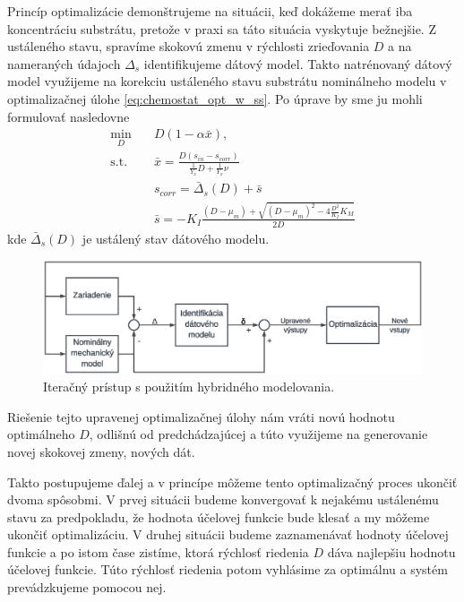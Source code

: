 Princíp optimalizácie demonštrujeme na situácii, keď dokážeme merať iba koncentráciu substrátu, pretože v praxi sa táto situácia vyskytuje bežnejšie. Z ustáleného stavu, spravíme skokovú zmenu v rýchlosti zrieďovania $ D $ a na nameraných údajoch $ \Delta_{s} $ identifikujeme dátový model. Takto natrénovaný dátový model využijeme na korekciu ustáleného stavu substrátu nominálneho modelu v optimalizačnej úlohe \eqref{eq:chemostat_opt_w_ss}. Po úprave by sme ju mohli formulovať nasledovne
\begin{equation}
\label{eq:hybrid_opt_subs}
	\begin{split}
		\min_{D} &\quad D\left(1-\alpha\bar{x}\right), \\
		\text{s.t.} &\quad \bar{x} = \frac{D\left(s_{in}-s_{corr}\right)}{\frac{1}{Y_{x}}D + \frac{1}{Y_{x}}\nu} \\
		&\quad s_{corr} = \bar{\Delta}_{s}(D) + \bar{s}\\
		&\quad \bar{s} = -K_{I}\frac{\left(D-\mu_{m}\right) + \sqrt{\left(D-\mu_{m}\right)^2 - 4\frac{D^2}{K_{I}}K_{M}}}{2D}
	\end{split}
\end{equation}
kde $ \bar{\Delta}_{s}(D) $ je ustálený stav dátového modelu.
\begin{figure}
	\centering
	\includegraphics[width=0.9\linewidth]{images/iteration_approach}
	\caption{Iteračný prístup s použitím hybridného modelovania.}
	\label{fig:iteration_approach}
\end{figure} 

Riešenie tejto upravenej optimalizačnej úlohy nám vráti novú hodnotu optimálneho $ D $, odlišnú od predchádzajúcej a túto využijeme na generovanie novej skokovej zmeny, nových dát. 

Takto postupujeme ďalej a v princípe môžeme tento optimalizačný proces ukončiť dvoma spôsobmi. V prvej situácii budeme konvergovať k nejakému ustálenému stavu za predpokladu, že hodnota účelovej funkcie bude klesať a my môžeme ukončiť optimalizáciu. V druhej situácii budeme zaznamenávať hodnoty účelovej funkcie a po istom čase zistíme, ktorá rýchlosť riedenia $ D $ dáva najlepšiu hodnotu účelovej funkcie. Túto rýchlosť riedenia potom vyhlásime za optimálnu a systém prevádzkujeme pomocou nej.

